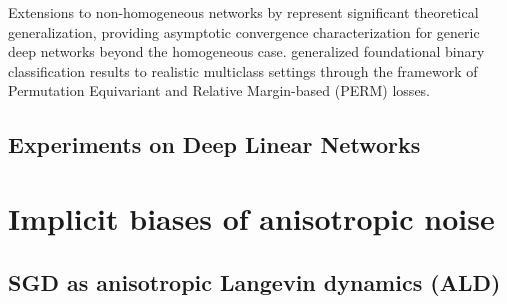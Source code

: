 \documentclass[11pt]{article}
\begin{document}
Extensions to non-homogeneous networks by \citet{cai2025implicit} represent significant theoretical generalization, providing asymptotic convergence characterization for generic deep networks beyond the homogeneous case. \citet{ravi2024implicit} generalized foundational binary classification results to realistic multiclass settings through the framework of Permutation Equivariant and Relative Margin-based (PERM) losses.

\subsection{Experiments on Deep Linear Networks}

\section{Implicit biases of anisotropic noise}
\subsection{SGD as anisotropic Langevin dynamics (ALD)}





\end{document}
